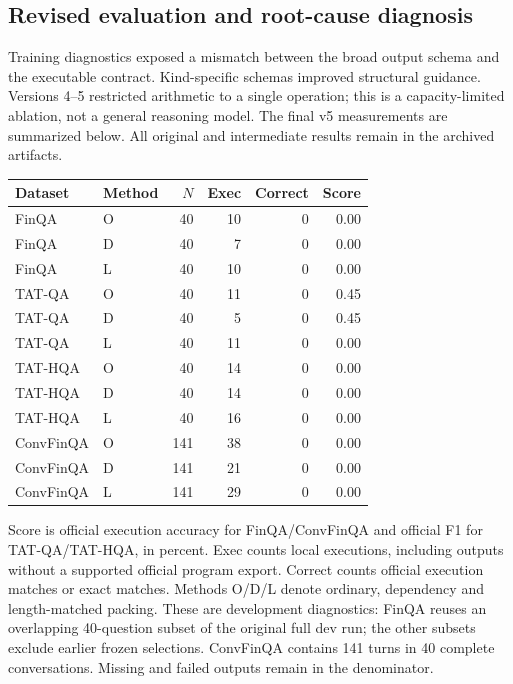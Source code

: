 \subsection{Revised evaluation and root-cause diagnosis}

Training diagnostics exposed a mismatch between the broad output schema and the executable contract. Kind-specific schemas improved structural guidance. Versions 4--5 restricted arithmetic to a single operation; this is a capacity-limited ablation, not a general reasoning model. The final v5 measurements are summarized below. All original and intermediate results remain in the archived artifacts.

\begin{center}\small\setlength{\tabcolsep}{3pt}\begin{tabular}{llrrrr}

Dataset & Method & $N$ & Exec & Correct & Score\\\hline

FinQA & O & 40 & 10 & 0 & 0.00\\

FinQA & D & 40 & 7 & 0 & 0.00\\

FinQA & L & 40 & 10 & 0 & 0.00\\

TAT-QA & O & 40 & 11 & 0 & 0.45\\

TAT-QA & D & 40 & 5 & 0 & 0.45\\

TAT-QA & L & 40 & 11 & 0 & 0.00\\

TAT-HQA & O & 40 & 14 & 0 & 0.00\\

TAT-HQA & D & 40 & 14 & 0 & 0.00\\

TAT-HQA & L & 40 & 16 & 0 & 0.00\\

ConvFinQA & O & 141 & 38 & 0 & 0.00\\

ConvFinQA & D & 141 & 21 & 0 & 0.00\\

ConvFinQA & L & 141 & 29 & 0 & 0.00\\

\end{tabular}\end{center}

Score is official execution accuracy for FinQA/ConvFinQA and official F1 for TAT-QA/TAT-HQA, in percent. Exec counts local executions, including outputs without a supported official program export. Correct counts official execution matches or exact matches. Methods O/D/L denote ordinary, dependency and length-matched packing. These are development diagnostics: FinQA reuses an overlapping 40-question subset of the original full dev run; the other subsets exclude earlier frozen selections. ConvFinQA contains 141 turns in 40 complete conversations. Missing and failed outputs remain in the denominator.

